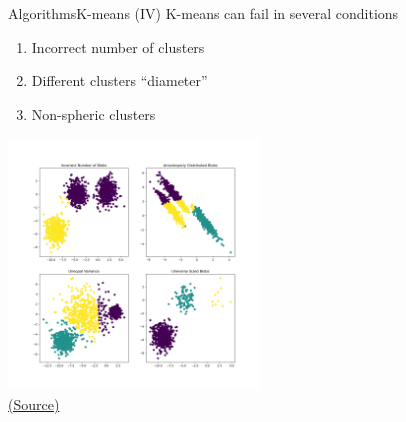 \documentclass[10pt,compress]{beamer} %
\begin{document}
\begin{frame}{Algorithms}{K-means (IV)}
    K-means can fail in several conditions
       \begin{enumerate}
        \item Incorrect number of clusters
        \item Different clusters ``diameter''
        \item Non-spheric clusters
       \end{enumerate}
	\centering \includegraphics[width=0.5\textwidth]{figs/kmeans-fails.png}\\
    \tiny{\href{https://scikit-learn.org/stable/auto_examples/cluster/plot_kmeans_assumptions.html}{(Source)}}
\end{frame}
\end{document}
